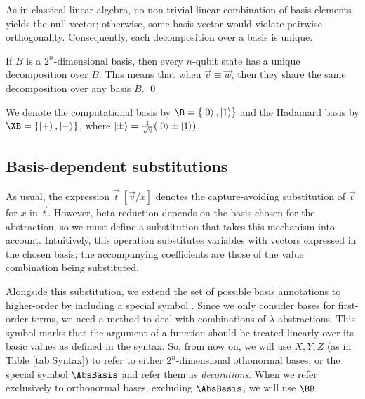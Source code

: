 As in classical linear algebra, no non-trivial linear combination of basis
elements yields the null vector; otherwise, some basis vector would violate
pairwise orthogonality. Consequently, each decomposition over a basis is
unique.

\begin{remark}\label{rem:UniqueDecomposition}\label{cor:EquivalentDecomposition}
  If $B$ is a $2^n$-dimensional basis, then every $n$-qubit state has a
  unique decomposition over $B$. This means that when $\vec{v} \equiv \vec{w}$,
  then they share the same decomposition over any basis $B$.
  \qed
\end{remark}

We denote the computational basis by $\B=\{\ket{0},\ket{1}\}$ and the Hadamard
basis by $\XB=\{\ket{+},\ket{-}\}$, where
$\left\vert{\pm}\right\rangle=\tfrac{1}{\sqrt{2}}(\left\vert{0}\right\rangle\pm\left\vert{1}\right\rangle)$.  

\subsection{Basis-dependent substitutions}
As usual, the expression $\vec t\ [\vec v/x]$ denotes the
capture-avoiding substitution of $\vec v$ for $x$ in $\vec t$.
However, beta-reduction depends on the basis chosen for the abstraction, so we must
define a substitution that takes this mechanism into account. Intuitively, this
operation substitutes variables with vectors expressed in the chosen basis; the
accompanying coefficients are those of the value combination being
substituted.

Alongside this substitution, we extend the set of possible basis annotations to
higher-order by including a special symbol \AbsBasis. Since we only consider bases
for first-order terms, we need a method to deal with combinations of 
$\lambda$-abstractions. This symbol marks that the argument of a function should be
treated linearly over its basic values as defined in the syntax. So, from now on, 
we will use $X, Y, Z$ (as in Table \ref{tab:Syntax}) to refer to either
$2^n$-dimensional othonormal bases, or the special symbol $\AbsBasis$ and
refer them as \emph{decorations}. When we refer exclusively to orthonormal bases,
excluding $\AbsBasis$, we will use $\BB$.

